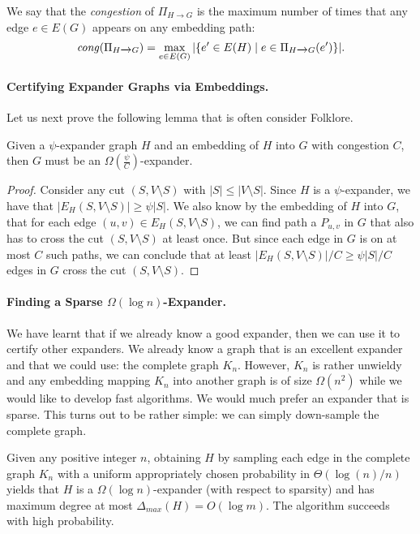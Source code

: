We say that the \emph{congestion} of $\Pi_{H \xrightarrow{} G}$ is the maximum number of times that any edge $e \in E(G)$ appears on any embedding path: \[
\mathit{cong}(\Pi_{H \xrightarrow{} G}) = \max_{e \in E(G)} |\{ e' \in E(H) \;|\; e \in \Pi_{H \xrightarrow{} G}(e') \}|.
\]

\paragraph{Certifying Expander Graphs via Embeddings.} Let us next prove the following lemma that is often consider Folklore.

\begin{lemma}\label{lma:folklore_embedding}
Given a $\psi$-expander graph $H$ and an embedding of $H$ into $G$ with congestion $C$, then $G$ must be an $\Omega\left(\frac{\psi}{C}\right)$-expander. 
\end{lemma}
\begin{proof}
Consider any cut $(S, V \setminus S)$ with $|S| \leq |V \setminus S|$. Since $H$ is a $\psi$-expander, we have that $|E_H(S, V \setminus S)| \geq \psi|S|$. We also know by the embedding of $H$ into $G$, that for each edge $(u,v) \in E_H(S, V \setminus S)$, we can find path a $P_{u,v}$ in $G$ that also has to cross the cut $(S, V \setminus S)$ at least once. But since each edge in $G$ is on at most $C$ such paths, we can conclude that at least $|E_H(S, V \setminus S)|/ C \geq \psi |S|/C$ edges in $G$ cross the cut $(S, V \setminus S)$. 
\end{proof}

\paragraph{Finding a Sparse $\Omega(\log n)$-Expander.} We have learnt that if we already know a good expander, then we can use it to certify other expanders. We already know a graph that is an excellent expander and that we could use: the complete graph $K_n$. However, $K_n$ is rather unwieldy and any embedding mapping $K_n$ into another graph is of size $\Omega(n^2)$ while we would like to develop fast algorithms. We would much prefer an expander that is sparse. This turns out to be rather simple: we can simply down-sample the complete graph. 

\begin{lemma}\label{lma:sampleDownCompleteGraph}
Given any positive integer $n$, obtaining $H$ by sampling each edge in the complete graph $K_n$ with a uniform appropriately chosen probability in $\Theta( \log(n)/n)$ yields that $H$ is a $\Omega(\log n)$-expander (with respect to sparsity) and has maximum degree at most $\Delta_{max}(H) = O(\log m)$. The algorithm succeeds with high probability.
\end{lemma}


